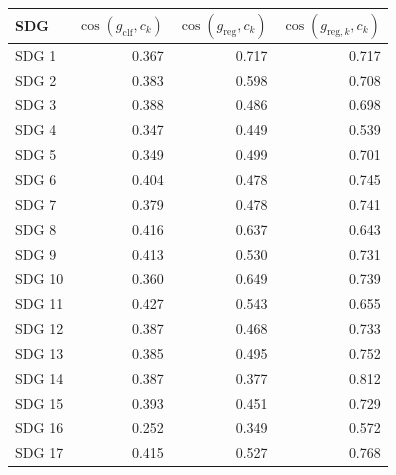 \begin{tabular}{lrrr}
\toprule
SDG & $\cos(g_{\mathrm{clf}}, c_k)$ & $\cos(g_{\mathrm{reg}}, c_k)$ & $\cos(g_{\mathrm{reg},k}, c_k)$ \\
\midrule
SDG 1 & 0.367 & 0.717 & 0.717 \\
SDG 2 & 0.383 & 0.598 & 0.708 \\
SDG 3 & 0.388 & 0.486 & 0.698 \\
SDG 4 & 0.347 & 0.449 & 0.539 \\
SDG 5 & 0.349 & 0.499 & 0.701 \\
SDG 6 & 0.404 & 0.478 & 0.745 \\
SDG 7 & 0.379 & 0.478 & 0.741 \\
SDG 8 & 0.416 & 0.637 & 0.643 \\
SDG 9 & 0.413 & 0.530 & 0.731 \\
SDG 10 & 0.360 & 0.649 & 0.739 \\
SDG 11 & 0.427 & 0.543 & 0.655 \\
SDG 12 & 0.387 & 0.468 & 0.733 \\
SDG 13 & 0.385 & 0.495 & 0.752 \\
SDG 14 & 0.387 & 0.377 & 0.812 \\
SDG 15 & 0.393 & 0.451 & 0.729 \\
SDG 16 & 0.252 & 0.349 & 0.572 \\
SDG 17 & 0.415 & 0.527 & 0.768 \\
\bottomrule
\end{tabular}

